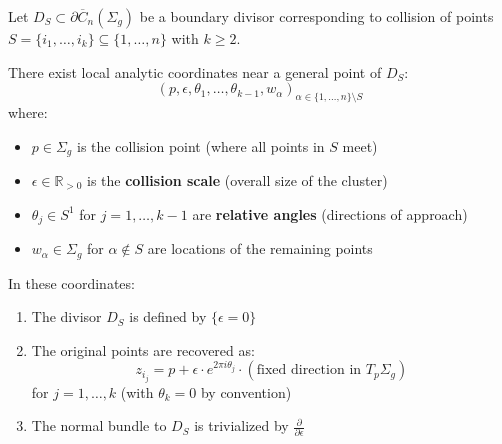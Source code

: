 \begin{theorem}\label{thm:local-coords-boundary}
Let $D_S \subset \partial\overline{C}_n(\Sigma_g)$ be a boundary divisor corresponding to collision of points $S = \{i_1, \ldots, i_k\} \subseteq \{1,\ldots,n\}$ with $k \geq 2$.

There exist local analytic coordinates near a general point of $D_S$:
$$(p, \epsilon, \theta_1, \ldots, \theta_{k-1}, w_{\alpha})_{\alpha \in \{1,\ldots,n\}\setminus S}$$
where:
\begin{itemize}
\item $p \in \Sigma_g$ is the collision point (where all points in $S$ meet)
\item $\epsilon \in \mathbb{R}_{>0}$ is the \textbf{collision scale} (overall size of the cluster)
\item $\theta_j \in S^1$ for $j=1,\ldots,k-1$ are \textbf{relative angles} (directions of approach)
\item $w_{\alpha} \in \Sigma_g$ for $\alpha \notin S$ are locations of the remaining points
\end{itemize}

In these coordinates:
\begin{enumerate}
\item The divisor $D_S$ is defined by $\{\epsilon = 0\}$
\item The original points are recovered as:
$$z_{i_j} = p + \epsilon \cdot e^{2\pi i \theta_j} \cdot (\text{fixed direction in } T_p\Sigma_g)$$
for $j = 1, \ldots, k$ (with $\theta_k = 0$ by convention)
\item The normal bundle to $D_S$ is trivialized by $\frac{\partial}{\partial \epsilon}$
\end{enumerate}
\end{theorem}

